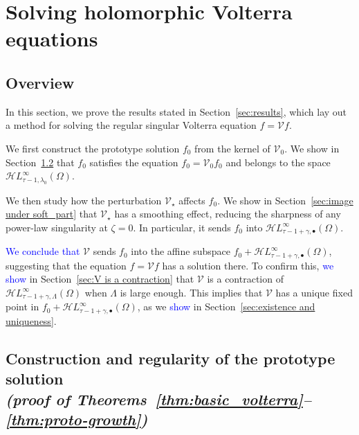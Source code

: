\documentclass[review]{siamart220329}
\newcommand{\singexp}[2]{\mathcal{H}L^\infty_{#1, #2}}
\newcommand{\singexpalg}[1]{\singexp{#1}{\bullet}}
\newcommand{\volterra}{\mathcal{V}}
\newcommand{\hardpart}{\mathcal{V}_0}
\newcommand{\softpart}{\mathcal{V}_\star}
\newcommand{\solwhole}{f}
\newcommand{\solproto}{f_0}
\newcommand{\domain}{\Omega}
\begin{document}
\section{Solving holomorphic Volterra equations}\label{sec:proof_main_results}
\subsection{Overview}
\color{blue}
In this section, we prove the results stated in Section~\ref{sec:results}, which lay out a method for solving the regular singular Volterra equation $\solwhole = \volterra \solwhole$.

We first construct the prototype solution $\solproto$ from the kernel of $\hardpart$. We show in Section~\ref{sec:proto-construction-regularity} that $\solproto$ satisfies the equation $\solproto = \hardpart \solproto$ and belongs to the space $\singexp{\tau-1}{\lambda_0}(\domain)$.

We then study how the perturbation $\softpart$ affects $\solproto$. We show in Section~\ref{sec:image under soft_part} that $\softpart$ has a smoothing effect, reducing the sharpness of any power-law singularity at $\zeta = 0$. In particular, it sends $\solproto$ into $\singexpalg{\tau-1+\gamma}(\domain)$.\color{black}

\textcolor{blue}{We conclude that} $\volterra$ sends $\solproto$ into the affine subspace $\solproto + \singexpalg{\tau-1+\gamma}(\domain)$, suggesting that the equation $\solwhole = \volterra \solwhole$ has a solution there. To confirm this, \textcolor{blue}{we show} in Section~\ref{sec:V is a contraction} that $\volterra$ is a contraction of $\singexp{\tau-1+\gamma}{\Lambda}(\domain)$ when $\Lambda$ is large enough. This implies that $\volterra$ has a unique fixed point in $\solproto + \singexpalg{\tau-1+\gamma}(\domain)$, as we \textcolor{blue}{show} in Section~\ref{sec:existence and uniqueness}.
\subsection{Construction and regularity of the prototype solution \\ \textit{(proof of Theorems~\ref{thm:basic_volterra}--\ref{thm:proto-growth})}}\label{sec:proto-construction-regularity}
\end{document}
